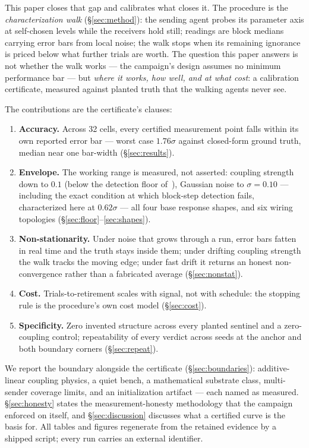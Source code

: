 \documentclass[11pt,a4paper]{article}
\begin{document}
This paper closes that gap and calibrates what closes it. The
procedure is the \emph{characterization walk}
(\S\ref{sec:method}): the sending agent probes its parameter axis
at self-chosen levels while the receivers hold still; readings are
block medians carrying error bars from local noise; the walk stops
when its remaining ignorance is priced below what further trials
are worth. The question this paper answers is not whether the walk
works --- the campaign's design assumes no minimum performance bar
--- but \emph{where it works, how well, and at what cost}: a
calibration certificate, measured against planted truth that the
walking agents never see.

The contributions are the certificate's clauses:
\begin{enumerate}
\item \textbf{Accuracy.} Across 32 cells, every certified
measurement point falls within its own reported error bar --- worst
case $1.76\sigma$ against closed-form ground truth, median near
one bar-width (\S\ref{sec:results}).
\item \textbf{Envelope.} The working range is measured, not
asserted: coupling strength down to $0.1$ (below the detection
floor of~\cite{p1}), Gaussian noise to $\sigma{=}0.10$ --- including
the exact condition at which block-step detection fails,
characterized here at $0.62\sigma$ --- all four base response
shapes, and six wiring topologies (\S\ref{sec:floor}--\ref{sec:shapes}).
\item \textbf{Non-stationarity.} Under noise that grows through a
run, error bars fatten in real time and the truth stays inside
them; under drifting coupling strength the walk tracks the moving
edge; under fast drift it returns an honest non-convergence rather
than a fabricated average (\S\ref{sec:nonstat}).
\item \textbf{Cost.} Trials-to-retirement scales with signal, not
with schedule: the stopping rule is the procedure's own cost model
(\S\ref{sec:cost}).
\item \textbf{Specificity.} Zero invented structure across every
planted sentinel and a zero-coupling control; repeatability of
every verdict across seeds at the anchor and both boundary corners
(\S\ref{sec:repeat}).
\end{enumerate}

We report the boundary alongside the certificate
(\S\ref{sec:boundaries}): additive-linear coupling physics, a quiet
bench, a mathematical substrate class, multi-sender coverage
limits, and an initialization artifact --- each named as measured.
\S\ref{sec:honesty} states the measurement-honesty methodology
that the campaign enforced on itself, and \S\ref{sec:discussion}
discusses what a certified curve is the basis for. All tables and
figures regenerate from the retained evidence by a shipped script;
every run carries an external identifier.
\end{document}
